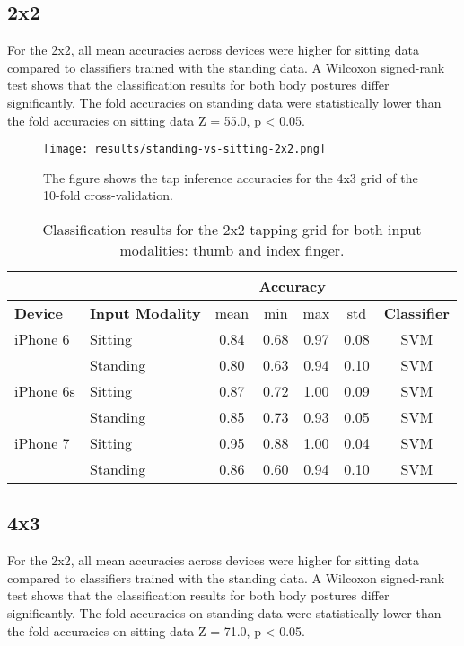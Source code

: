 \begin{appendix}
\subsection*{2x2}
For the 2x2, all mean accuracies across devices were higher for sitting data compared to classifiers trained with the standing data. A Wilcoxon signed-rank test shows that the classification results for both body postures differ significantly. The fold accuracies on standing data were statistically lower than the fold accuracies on sitting data Z = 55.0, p < 0.05.

\begin{figure}[h!]
  \centering
  \texttt{[image: results/standing-vs-sitting-2x2.png]}
  \caption{The figure shows the tap inference accuracies for the 4x3 grid of the 10-fold cross-validation.} \label{fig:participation}
\end{figure}

\begin{table}[h!]
  \centering
\begin{tabular}{|l|l|c|c|c|c|c|}
  \cline{3-6}
  \multicolumn{2}{c}{} & \multicolumn{4}{|c|}{\textbf{Accuracy}}  \\
  \hline
  \textbf{Device} & \textbf{Input Modality} & mean &   min &   max  & std &  \textbf{Classifier} \\
  \hline
	iPhone 6 & Sitting &  0.84 &     0.68 &     0.97 &     0.08 &  SVM \\
	& Standing &      0.80 &     0.63 &     0.94 &     0.10 &  SVM \\
	\hline
	iPhone 6s & Sitting &      0.87 &     0.72 &     1.00 &     0.09 &  SVM \\
	& Standing &      0.85 &     0.73 &     0.93 &     0.05 &  SVM \\
	\hline
	iPhone 7 & Sitting &      0.95 &     0.88 &     1.00 &     0.04 &  SVM \\
	& Standing &      0.86 &     0.60 &     0.94 &     0.10 &  SVM \\
	\hline
\end{tabular}
  \caption{Classification results for the 2x2 tapping grid for both input modalities: thumb and index finger.}
\end{table}


\subsection*{4x3}
For the 2x2, all mean accuracies across devices were higher for sitting data compared to classifiers trained with the standing data. A Wilcoxon signed-rank test shows that the classification results for both body postures differ significantly. The fold accuracies on standing data were statistically lower than the fold accuracies on sitting data Z = 71.0, p < 0.05.


\end{appendix}
